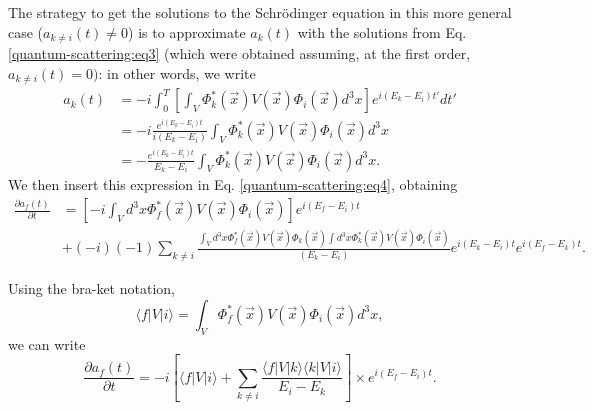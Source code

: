 The strategy to get the solutions to the Schr\"odinger equation in this more general case ($a_{k\neq i} (t) \neq 0$) is to approximate $a_k(t)$ with the solutions from Eq. \eqref{quantum-scattering:eq3} (which were obtained assuming, at the first order, $a_{k\neq i}(t)=0)$: in other words, we write
\begin{equation*}
\begin{split}
    a_{k}(t) &= -i \int_{0}^{T}\left[\int_{V}\Phi_{k}^*(\Vec{x}) V(\Vec{x})\Phi_{i}(\Vec{x})d^3x \right] e^{i(E_{k}-E_{i})t'}dt'\\
    &= -i\frac{e^{i(E_k-E_i)t}}{i(E_k-E_i)}\int_V\Phi_k^*(\Vec{x}) V(\Vec{x})\Phi_i(\vec{x}) d^3x\\
    &= -\frac{e^{i(E_k-E_i)t}}{E_k-E_i} \int_V \Phi_k^*(\Vec{x}) V(\Vec{x})\Phi_i(\vec{x}) d^3x.
\end{split}
\end{equation*}
We then insert this expression in Eq. \eqref{quantum-scattering:eq4}, obtaining 
\begin{equation*}
\begin{split}
    \frac{\partial a_{f}(t)}{\partial t} &= \left[-i\int_{V} d^3x \Phi_{f}^*(\Vec{x}) V(\Vec{x})\Phi_{i}(\Vec{x}) \right] e^{i(E_{f}-E_{i})t} \\
    &+ (-i)(-1) \sum_{k\neq i} \frac{\int_{V}d^3x\Phi_{f}^*(\Vec{x})V(\Vec{x})\Phi_{k}(\Vec{x})\int d^3x\Phi_{k}^*(\Vec{x})V(\Vec{x})\Phi_{i}(\Vec{x})}{(E_{k}-E_{i})} e^{i(E_{k}-E_{i})t} e^{i(E_{f}-E_{k})t}.
\end{split}
\end{equation*}

Using the bra-ket notation,
\begin{equation*}
    \langle f | V | i \rangle = \int_{V}\Phi_{f}^*(\Vec{x})V(\Vec{x})\Phi_{i}(\Vec{x}) d^3x,
\end{equation*}
we can write
\begin{equation*}
    \frac{\partial a_{f}(t)}{\partial t} = -i \left[\langle f | V | i \rangle + \sum_{k\neq i} \frac{\langle f | V | k \rangle\langle k | V | i \rangle}{E_{i}-E_{k}} \right] \times e^{i(E_{f}-E_{i})t}.
\end{equation*}

